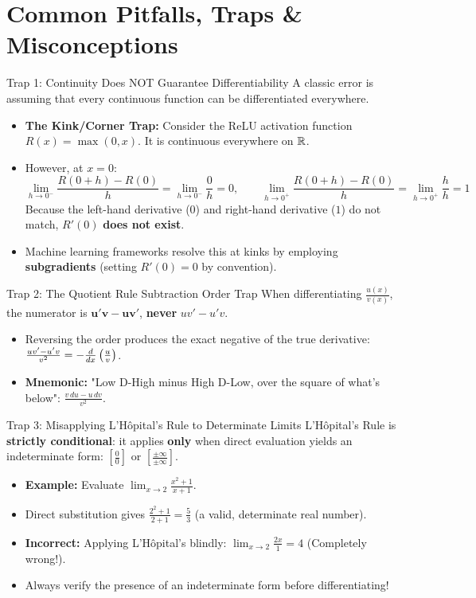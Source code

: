 \section{Common Pitfalls, Traps \& Misconceptions}

\begin{trapbox}{Trap 1: Continuity Does NOT Guarantee Differentiability}
A classic error is assuming that every continuous function can be differentiated everywhere.
\begin{itemize}
    \item \textbf{The Kink/Corner Trap:} Consider the ReLU activation function $R(x) = \max(0, x)$. It is continuous everywhere on $\mathbb{R}$.
    \item However, at $x = 0$:
    $$\lim_{h \to 0^-} \frac{R(0+h) - R(0)}{h} = \lim_{h \to 0^-} \frac{0}{h} = 0, \qquad \lim_{h \to 0^+} \frac{R(0+h) - R(0)}{h} = \lim_{h \to 0^+} \frac{h}{h} = 1$$
    Because the left-hand derivative ($0$) and right-hand derivative ($1$) do not match, $R'(0)$ \textbf{does not exist}.
    \item Machine learning frameworks resolve this at kinks by employing \textbf{subgradients} (setting $R'(0) = 0$ by convention).
\end{itemize}
\end{trapbox}

\begin{trapbox}{Trap 2: The Quotient Rule Subtraction Order Trap}
When differentiating $\frac{u(x)}{v(x)}$, the numerator is $\mathbf{u'v - uv'}$, \textbf{never} $uv' - u'v$.
\begin{itemize}
    \item Reversing the order produces the exact negative of the true derivative: $\frac{uv' - u'v}{v^2} = -\frac{d}{dx}\left(\frac{u}{v}\right)$.
    \item \textbf{Mnemonic:} "Low D-High minus High D-Low, over the square of what's below": $\frac{v \, du - u \, dv}{v^2}$.
\end{itemize}
\end{trapbox}

\begin{trapbox}{Trap 3: Misapplying L'Hôpital's Rule to Determinate Limits}
L'Hôpital's Rule is \textbf{strictly conditional}: it applies \textbf{only} when direct evaluation yields an indeterminate form: $\left[\frac{0}{0}\right]$ or $\left[\frac{\pm\infty}{\pm\infty}\right]$.
\begin{itemize}
    \item \textbf{Example:} Evaluate $\lim_{x \to 2} \frac{x^2 + 1}{x + 1}$.
    \item Direct substitution gives $\frac{2^2 + 1}{2 + 1} = \frac{5}{3}$ (a valid, determinate real number).
    \item \textbf{Incorrect:} Applying L'Hôpital's blindly: $\lim_{x \to 2} \frac{2x}{1} = 4$ (Completely wrong!).
    \item Always verify the presence of an indeterminate form before differentiating!
\end{itemize}
\end{trapbox}

